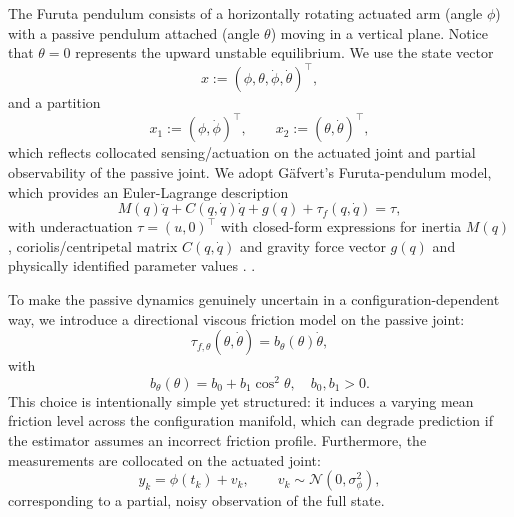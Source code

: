 \documentclass[final,5p,times,twocolumn]{elsarticle}
\begin{document}
The Furuta pendulum consists of a horizontally rotating actuated arm (angle $\phi$) with a passive pendulum attached (angle $\theta$) moving in a vertical plane. Notice that $\theta=0$ represents the upward unstable equilibrium. We use the state vector
\begin{equation}
	x := (\phi,\theta,\dot{\phi},\dot{\theta})^\top,
\end{equation}
and a partition
\begin{equation}
	x_1 := (\phi,\dot{\phi})^\top, \qquad x_2 := (\theta,\dot{\theta})^\top,
	\label{eq:furuta_partition}
\end{equation}
which reflects collocated sensing/actuation on the actuated joint and partial observability of the passive joint. We adopt Gäfvert’s Furuta-pendulum model, which provides an Euler-Lagrange description $$M(q)\ddot q + C(q,\dot q)\dot q + g(q) + \tau_f(q,\dot q)=\tau,$$ with underactuation $\tau=(u,0)^\top$ with closed-form expressions for inertia $M(q)$,  coriolis/centripetal matrix $C(q,\dot q)$ and gravity force vector $g(q)$ and physically identified parameter values \citep{Gafvert1998}. .

To make the passive dynamics genuinely uncertain in a configuration-dependent way, we introduce a directional viscous friction model on the passive joint:
\begin{equation}
	\tau_{f,\theta}(\theta,\dot{\theta}) = b_\theta(\theta)\dot{\theta},
	\label{eq:dir_friction}
\end{equation}
with
\begin{equation}
	b_\theta(\theta) = b_0 + b_1\cos^2\theta, \quad b_0,b_1>0.
\end{equation}
This choice is intentionally simple yet structured: it induces a varying mean friction level across the configuration manifold, which can degrade prediction if the estimator assumes an incorrect friction profile.
Furthermore, the measurements are collocated on the actuated joint:
\begin{equation}
	y_k = \phi(t_k) + v_k, \qquad v_k\sim\mathcal{N}(0,\sigma_\phi^2),
	\label{eq:furuta_meas}
\end{equation}
corresponding to a partial, noisy observation of the full state.
\end{document}
